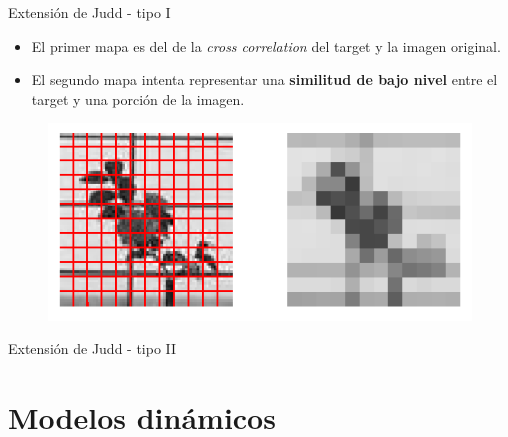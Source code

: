 \documentclass[compress]{beamer}
\begin{document}
\begin{frame}{Extensión de Judd - tipo I}

\begin{itemize}
\item El primer mapa es del de la \textit{cross correlation} del target y la imagen original.
\item El segundo mapa intenta representar una \textbf{similitud de bajo nivel} entre el target y una porción de la imagen.
\end{itemize}

\begin{figure}
\includegraphics[width=0.7\linewidth]{images/grilla-gorda.png} 
\end{figure}

\end{frame}

\begin{frame}{Extensión de Judd - tipo II}
\end{frame}

\begin{frame}
\end{frame}

\begin{frame}
\end{frame}


\begin{frame}
\end{frame}




\section{Modelos dinámicos}
\begin{frame}
\end{frame}

\begin{frame}
\end{frame}
\end{document}

